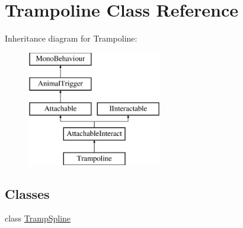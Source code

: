\hypertarget{class_trampoline}{}\section{Trampoline Class Reference}
\label{class_trampoline}
Inheritance diagram for Trampoline\+:\begin{figure}[H]
\begin{center}
\leavevmode
\includegraphics[height=5.000000cm]{class_trampoline}
\end{center}
\end{figure}
\subsection*{Classes}
\begin{DoxyCompactItemize}
\item 
class \mbox{\hyperlink{class_trampoline_1_1_tramp_spline}{Tramp\+Spline}}
\end{DoxyCompactItemize}
